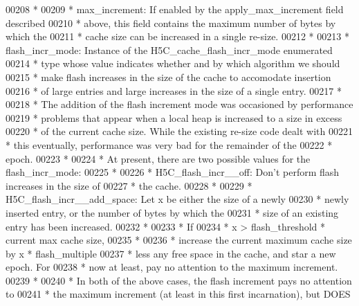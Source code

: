 \begin{DoxyCode}
00208 \textcolor{comment}{ *}
00209 \textcolor{comment}{ * max\_increment: If enabled by the apply\_max\_increment field described}
00210 \textcolor{comment}{ *      above, this field contains the maximum number of bytes by which the}
00211 \textcolor{comment}{ *      cache size can be increased in a single re-size.}
00212 \textcolor{comment}{ *}
00213 \textcolor{comment}{ * flash\_incr\_mode:  Instance of the H5C\_cache\_flash\_incr\_mode enumerated}
00214 \textcolor{comment}{ *      type whose value indicates whether and by which algorithm we should}
00215 \textcolor{comment}{ *      make flash increases in the size of the cache to accomodate insertion}
00216 \textcolor{comment}{ *      of large entries and large increases in the size of a single entry.}
00217 \textcolor{comment}{ *}
00218 \textcolor{comment}{ *      The addition of the flash increment mode was occasioned by performance}
00219 \textcolor{comment}{ *      problems that appear when a local heap is increased to a size in excess}
00220 \textcolor{comment}{ *      of the current cache size.  While the existing re-size code dealt with}
00221 \textcolor{comment}{ *      this eventually, performance was very bad for the remainder of the}
00222 \textcolor{comment}{ *      epoch.}
00223 \textcolor{comment}{ *}
00224 \textcolor{comment}{ *      At present, there are two possible values for the flash\_incr\_mode:}
00225 \textcolor{comment}{ *}
00226 \textcolor{comment}{ *      H5C\_flash\_incr\_\_off:  Don't perform flash increases in the size of}
00227 \textcolor{comment}{ *              the cache.}
00228 \textcolor{comment}{ *}
00229 \textcolor{comment}{ *      H5C\_flash\_incr\_\_add\_space:  Let x be either the size of a newly}
00230 \textcolor{comment}{ *              newly inserted entry, or the number of bytes by which the}
00231 \textcolor{comment}{ *              size of an existing entry has been increased.}
00232 \textcolor{comment}{ *}
00233 \textcolor{comment}{ *              If}
00234 \textcolor{comment}{ *                      x > flash\_threshold * current max cache size,}
00235 \textcolor{comment}{ *}
00236 \textcolor{comment}{ *              increase the current maximum cache size by x * flash\_multiple}
00237 \textcolor{comment}{ *              less any free space in the cache, and star a new epoch.  For}
00238 \textcolor{comment}{ *              now at least, pay no attention to the maximum increment.}
00239 \textcolor{comment}{ *}
00240 \textcolor{comment}{ *      In both of the above cases, the flash increment pays no attention to}
00241 \textcolor{comment}{ *      the maximum increment (at least in this first incarnation), but DOES}

\end{DoxyCode}
